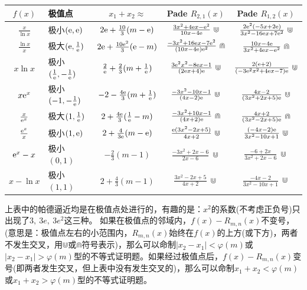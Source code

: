 \begin{itemize}[leftmargin=\inteval{\myitemleftmargin}pt,itemsep=
   \inteval{\myitemitempsep}pt,topsep=\inteval{\myitemtopsep}pt]
\renewcommand\arraystretch{1.26}
\begin{table}[!htbp]
\centering
\begin{tabular}{|c|l|c|c|c|}
\hline
$ f(x) $ & 极值点 & $ x_1+x_2\approx $ & Pade $ R_{2,1}(x) $ & Pade $ R_{1,2}(x) $ \\ \hline
$ \frac{x}{\ln x} $& 极小$ (\mathrm{e},\mathrm{e}) $ & $ 2\mathrm{e}+\frac{10}{3}(m-\mathrm{e}) $ &  $ \frac{3x^2+4\mathrm{e} x-\mathrm{e}^2}{10x-4\mathrm{e}}\ \Cup $ & $ \frac{2\e^{2}(-5x+2\e)}{3x^2-16\e x+7\e^2}\ \Cup $  \\ \hline
$ \frac{\ln x}{x} $&  极大$ (\mathrm{e},\frac{1}{\mathrm{e}}) $ & $ 2\mathrm{e}+\frac{10\mathrm{e}^2}{3}(\mathrm{e}-m) $ & $ \frac{-3x^2+16\e x-7\e^2}{(10x-4\e)\e^2}\ \Cap  $ & $ \frac{10x-4\mathrm{e}}{3x^2+4\mathrm{e} x-\mathrm{e}^2}\ \Cap  $  \\ \hline
$ x\ln x $ & 极小$ (\frac{1}{\mathrm{e}},-\frac{1}{\mathrm{e}}) $ & $ \frac{2}{\mathrm{e}}+\frac{2}{3}(m+\frac{1}{\mathrm{e}}) $ & $ \frac{3\e^2x^2-8\e x-1}{(2\e x+4)\e}\ \Cup $ & $ \frac{2(\mathrm{e} +2)}{(-3\mathrm{e}^2x^2+4\mathrm{e} x-7)\mathrm{e}}\ \Cup $  \\ \hline
$ x\mathrm{e}^x $ & 极小$ (-1,-\frac{1}{\mathrm{e}}) $ & $ -2-\frac{4\mathrm{e}}{3}(m+\frac{1}{\mathrm{e}}) $ & $ \frac{-3x^2-10x-1}{(4x-2)\mathrm{e}}\ \Cup $ & $ \frac{4x-2}{(3x^2+2x+5)\mathrm{e}}\ \Cup $  \\ \hline
$ \frac{x}{\mathrm{e}^x} $ & 极大$ (1,\frac{1}{\mathrm{e}}) $ & $ 2+\frac{4\mathrm{e}}{3}(\frac{1}{\mathrm{e}}-m) $ & $ \frac{-3x^2+10x-1}{(4x+2)\mathrm{e}}\ \Cap $ & $ \frac{4x+2}{(3x^2-2x+5)\mathrm{e}}\ \Cap $  \\ \hline
$ \frac{\mathrm{e}^x}{x} $ & 极小$ (1,\mathrm{e}) $ & $ 2+\frac{4}{3\mathrm{e}}(m-\mathrm{e}) $ &  $ \frac{\mathrm{e}(3x^2-2x+5)}{4x+2}\ \Cup $ & $ \frac{(-4x-2)\mathrm{e}}{3x^2-10x+1}\ \Cup $  \\ \hline
$ \mathrm{e}^x-x $ & 极小$ (0,1) $ & $ -\frac{2}{3}(m-1) $ & $ \frac{-3x^2+2x-6}{2x-6}\ \Cup $ & $ \frac{-6+2x}{3x^2+2x-6}\ \Cup $  \\ \hline
$ x-\ln x  $ & 极小$ (1,1) $ & $ 2+\frac{4}{3}(m-1) $ & $ \frac{3x^2-2x+5}{4x+2}\ \Cup $ & $ \frac{-4x-2}{3x^2-10x+1}\ \Cup $ \\ \hline
\end{tabular}
\end{table} 


上表中的帕德逼近均是在极值点处进行的，有趣的是：$ x^2 $的系数(不考虑正负号)只出现了$ 3,\ 3e,\ 3e^2 $这三种。
如果在极值点的邻域内，$ f(x)-R_{m,n}(x) $不变号，(意思是：极值点左右的小范围内，$ R_{m,n}(x) $始终在$ f(x) $的上方(或下方)，两者不发生交叉，用$ \Cup $或$ \Cap $符号表示)，那么可以命制$ |x_2-x_1|<\varphi(m) $或$ |x_2-x_1|>\varphi(m) $型的不等式证明题。如果经过极值点后，$  f(x)-R_{m,n}(x) $变号(即两者发生交叉，但上表中没有发生交叉的)，那么可以命制$ x_1+x_2<\varphi(m) $或$ x_1+x_2>\varphi(m) $型的不等式证明题。


\end{itemize}
